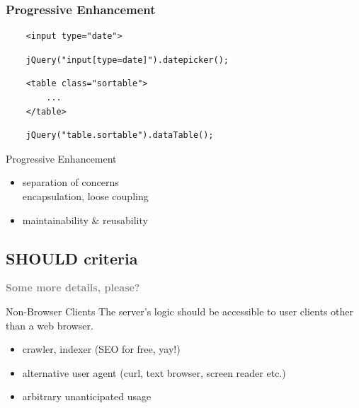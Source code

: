 \documentclass{beamer}
\begin{document}
\begin{frame}[fragile]
  \frametitle{Progressive Enhancement}

  \begin{verbatim}
    <input type="date">
  \end{verbatim}
  \begin{verbatim}
    jQuery("input[type=date]").datepicker();
  \end{verbatim}

  \vspace*{0.5cm}
  \begin{verbatim}
    <table class="sortable">
        ...
    </table>
  \end{verbatim}
  \begin{verbatim}
    jQuery("table.sortable").dataTable();
  \end{verbatim}
\end{frame}

\begin{frame}{Progressive Enhancement}
  \begin{itemize}
    \item separation of concerns \\ encapsulation, loose coupling
    \item maintainability \& reusability
  \end{itemize}
\end{frame}

\subsection{SHOULD criteria}

\begin{frame}
  \vspace*{-1cm}
  \textcolor{gray}{
    \begin{center}
      \textbf{
        \fontsize{60}{50}\selectfont Some more details, please?
      }
    \end{center}
  }
\end{frame}

\begin{frame}{Non-Browser Clients}
  The server's logic should be accessible to user clients other than a web browser.

  \begin{itemize}
    \item crawler, indexer (SEO for free, yay!)
    \item alternative user agent (curl, text browser, screen reader etc.)
    \item arbitrary unanticipated usage
  \end{itemize}
\end{frame}
\end{document}
